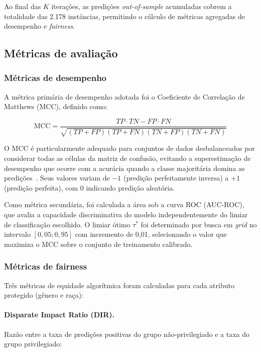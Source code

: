 \documentclass[12pt]{article}
\begin{document}
Ao final das $K$ iterações, as predições \textit{out-of-sample} acumuladas cobrem a totalidade das 2.178 instâncias, permitindo o cálculo de métricas agregadas de desempenho e \textit{fairness}.

\subsection{Métricas de avaliação}

\subsubsection{Métricas de desempenho}

A métrica primária de desempenho adotada foi o Coeficiente de Correlação de Matthews (MCC), definido como:

\begin{equation}
\text{MCC} = \frac{TP \cdot TN - FP \cdot FN}{\sqrt{(TP+FP)(TP+FN)(TN+FP)(TN+FN)}}
\end{equation}

O MCC é particularmente adequado para conjuntos de dados desbalanceados por considerar todas as células da matriz de confusão, evitando a superestimação de desempenho que ocorre com a acurácia quando a classe majoritária domina as predições~\cite{chicco:2020}. Seus valores variam de $-1$ (predição perfeitamente inversa) a $+1$ (predição perfeita), com 0 indicando predição aleatória.

Como métrica secundária, foi calculada a área sob a curva ROC (AUC-ROC), que avalia a capacidade discriminativa do modelo independentemente do limiar de classificação escolhido. O limiar ótimo $\tau^*$ foi determinado por busca em \textit{grid} no intervalo $[0{,}05; 0{,}95]$ com incremento de 0,01, selecionando o valor que maximiza o MCC sobre o conjunto de treinamento calibrado.

\subsubsection{Métricas de fairness}

Três métricas de equidade algorítmica foram calculadas para cada atributo protegido (gênero e raça):

\paragraph{Disparate Impact Ratio (DIR).} Razão entre a taxa de predições positivas do grupo não-privilegiado e a taxa do grupo privilegiado:
\end{document}
